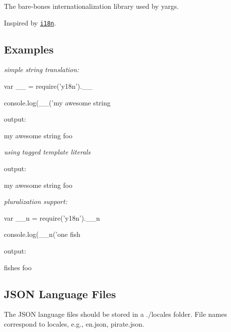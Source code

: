 \href{https://travis-ci.org/yargs/y18n}{\tt } \href{https://coveralls.io/github/yargs/y18n}{\tt } \href{https://npmjs.org/package/y18n}{\tt } \href{https://github.com/feross/standard}{\tt } \href{https://conventionalcommits.org}{\tt }

The bare-\/bones internationalization library used by yargs.

Inspired by \href{https://www.npmjs.com/package/i18n}{\tt i18n}.

\subsection*{Examples}

{\itshape simple string translation\+:}


\begin{DoxyCode}
var \_\_ = require('y18n').\_\_

console.log(\_\_('my awesome string %
\end{DoxyCode}


output\+:

{\ttfamily my awesome string foo}

{\itshape using tagged template literals}




output\+:

{\ttfamily my awesome string foo}

{\itshape pluralization support\+:}


\begin{DoxyCode}
var \_\_n = require('y18n').\_\_n

console.log(\_\_n('one fish %
\end{DoxyCode}


output\+:

{ fishes foo}

\subsection*{J\+S\+ON Language Files}

The J\+S\+ON language files should be stored in a {\ttfamily ./locales} folder. File names correspond to locales, e.\+g., {\ttfamily en.\+json}, {\ttfamily pirate.\+json}.

